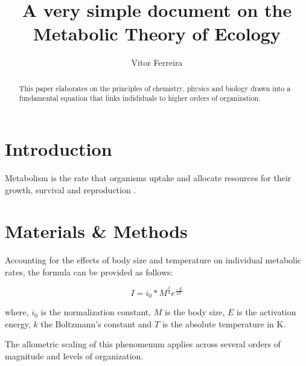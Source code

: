 \documentclass[12pt]{article}
\title{A very simple document on the Metabolic Theory of Ecology}
\author{Vitor Ferreira}
\date{}
\begin{document}
  \maketitle
  
  \begin{abstract}

    This paper elaborates on the principles of chemistry, physics and biology drawn into a fundamental equation that links indididuals to higher orders of organization.
  \end{abstract}
  
  \section{Introduction}

    Metabolism is the rate that organisms uptake and allocate resources for their growth, survival and reproduction \cite{brown2004toward}.
  \section{Materials \& Methods}

    Accounting for the effects of body size and temperature on individual metabolic rates, the formula can be provided as follows:
  
  \begin{equation}
    I = i_0 * M^\frac{3}{4} e^\frac{-E}{kT}
  \end{equation}

    where, $i_0$ is the normalization constant, $M$ is the body size, $E$ is the activation energy, $k$ the Boltzmann's constant and $T$ is the absolute temperature in K.
    
    The allometric scaling of this phenomenum applies across several orders of magnitude and levels of organization.
  
  
  
  
\end{document}

